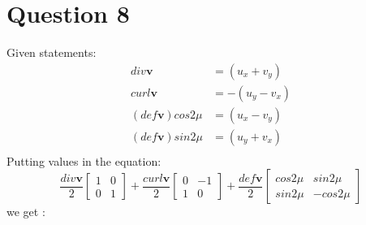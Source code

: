 \documentclass{article}
\begin{document}
\section*{Question 8}
Given statements:
\begin{align*}
  div\mathbf{v} &= (u_x+v_y) \\
  curl\mathbf{v} &= -(u_y-v_x) \\
  (def\mathbf{v})cos2\mu &= (u_x - v_y) \\ 
  (def\mathbf{v})sin2\mu &= (u_y + v_x) \\ 
\end{align*}
Putting values in the equation:
$$
  \frac{div\mathbf{v}}{2}\begin{bmatrix}1&0\\0&1\end{bmatrix}
+ \frac{curl\mathbf{v}}{2}\begin{bmatrix}0&-1\\1&0\end{bmatrix}
+ \frac{def\mathbf{v}}{2}\begin{bmatrix} cos2\mu & sin2\mu \\ sin2\mu & -cos2\mu \end{bmatrix}
$$
we get :
\end{document}
